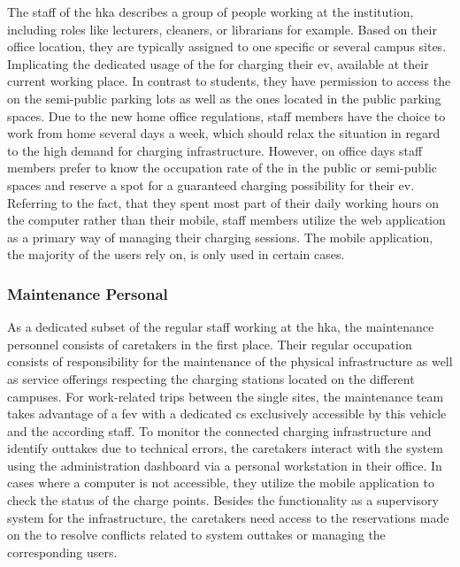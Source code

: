 The staff of the \acrshort{hka} describes a group of people working at the institution, including roles like lecturers, cleaners, or librarians for example.
Based on their office location, they are typically assigned to one specific or several campus sites. Implicating the dedicated usage of the  for charging their \acrshort{ev}, available at their current working place.
In contrast to students, they have permission to access the  on the semi-public parking lots as well as the ones located in the public parking spaces. 
Due to the new home office regulations, staff members have the choice to work from home several days a week, which should relax the situation in regard to the high demand for charging infrastructure.
However, on office days staff members prefer to know the occupation rate of the  in the public or semi-public spaces and reserve a spot for a guaranteed charging possibility for their \acrshort{ev}.
Referring to the fact, that they spent most part of their daily working hours on the computer rather than their mobile, staff members utilize the web application as a primary way of managing their charging sessions.
The mobile application, the majority of the users rely on, is only used in certain cases.

\subsubsection{Maintenance Personal}
\label{ch:Requirements Engineering:sec:Stakeholders:ssec:Staff:sssec:Maintenance Personal}

As a dedicated subset of the regular staff working at the \acrshort{hka}, the maintenance personnel consists of caretakers in the first place. Their regular occupation consists of responsibility for the maintenance of the physical infrastructure as well as service offerings respecting the charging stations located on the different campuses.
For work-related trips between the single sites, the maintenance team takes advantage of a \acrshort{fev} with a dedicated \acrshort{cs} exclusively accessible by this vehicle and the according staff.
To monitor the connected charging infrastructure and identify outtakes due to technical errors, the caretakers interact with the system using the administration dashboard via a personal workstation in their office. In cases where a computer is not accessible, they utilize the mobile application to check the status of the charge points.
Besides the functionality as a supervisory system for the infrastructure, the caretakers need access to the reservations made on the  to resolve conflicts related to system outtakes or managing the corresponding users.

